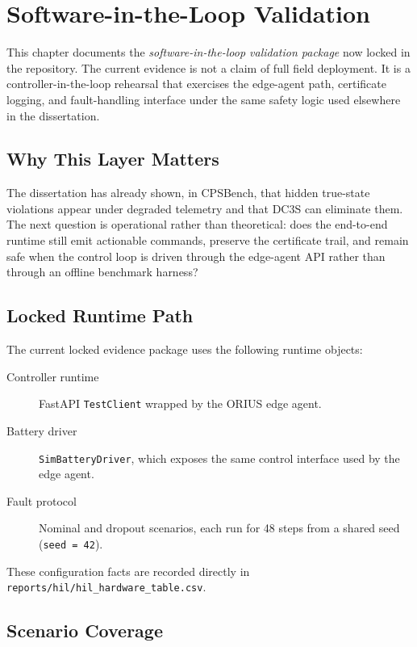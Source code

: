\chapter{Software-in-the-Loop Validation}
\label{ch:hil}

This chapter documents the \emph{software-in-the-loop validation package} now
locked in the repository.  The current evidence is not a claim of full
field deployment.  It is a controller-in-the-loop rehearsal that exercises
the edge-agent path, certificate logging, and fault-handling interface under
the same safety logic used elsewhere in the dissertation.

\section{Why This Layer Matters}

The dissertation has already shown, in CPSBench, that hidden
true-state violations appear under degraded telemetry and that DC3S can
eliminate them.  The next question is operational rather than theoretical:
does the end-to-end runtime still emit actionable commands, preserve the
certificate trail, and remain safe when the control loop is driven through
the edge-agent API rather than through an offline benchmark harness?

\section{Locked Runtime Path}

The current locked evidence package uses the following runtime objects:

\begin{description}
  \item[Controller runtime] FastAPI \texttt{TestClient} wrapped by the
    ORIUS edge agent.
  \item[Battery driver] \texttt{SimBatteryDriver}, which exposes the same
    control interface used by the edge agent.
  \item[Fault protocol] Nominal and dropout scenarios, each run for
    48 steps from a shared seed (\texttt{seed = 42}).
\end{description}

These configuration facts are recorded directly in
\texttt{reports/hil/hil\_hardware\_table.csv}.

\section{Scenario Coverage}

